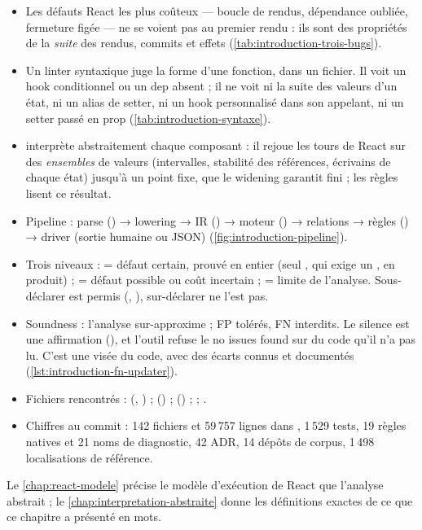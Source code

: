 \begin{resume}
  \begin{itemize}
    \item Les défauts React les plus coûteux --- boucle de rendus, dépendance
      oubliée, fermeture figée --- ne se voient pas au premier rendu : ils
      sont des propriétés de la \emph{suite} des rendus, commits et effets
      (\cref{tab:introduction-trois-bugs}).
    \item Un linter syntaxique juge la forme d'une fonction, dans un fichier.
      Il voit un hook conditionnel ou un dep absent ; il ne voit ni la suite
      des valeurs d'un état, ni un alias de setter, ni un hook personnalisé
      dans son appelant, ni un setter passé en prop
      (\cref{tab:introduction-syntaxe}).
    \item \reactant{} interprète abstraitement chaque composant : il rejoue
      les tours de React sur des \emph{ensembles} de valeurs (intervalles,
      stabilité des références, écrivains de chaque état) jusqu'à un point
      fixe, que le widening garantit fini ; les règles lisent ce résultat.
    \item Pipeline : parse () → lowering → IR ()
      → moteur () → relations → règles
      () → driver (sortie humaine ou JSON)
      (\cref{fig:introduction-pipeline}).
    \item Trois niveaux : \Error{} = défaut certain, prouvé en entier (seul
      , qui exige un , en produit) ;
      \Warning{} = défaut possible ou coût incertain ; \Info{} = limite de
      l'analyse. Sous-déclarer est permis (, ),
      sur-déclarer ne l'est pas.
    \item Soundness : l'analyse sur-approxime ; FP tolérés, FN interdits. Le
      silence est une affirmation (), et l'outil refuse le
      \og no issues found\fg{} sur du code qu'il n'a pas lu. C'est une visée
      du code, avec des écarts connus et documentés
      (\cref{lst:introduction-fn-updater}).
    \item \sloppy Fichiers rencontrés :
       (,
      ) ; 
      () ;  () ;
       ; .
    \item Chiffres au commit \snapshotCommit{} : 142 fichiers et
      59\,757 lignes dans , 1\,529 tests, 19 règles natives et
      21 noms de diagnostic, 42 ADR, 14 dépôts de corpus, 1\,498
      localisations de référence.
  \end{itemize}
  Le \cref{chap:react-modele} précise le modèle d'exécution de React que
  l'analyse abstrait ; le \cref{chap:interpretation-abstraite} donne les
  définitions exactes de ce que ce chapitre a présenté en mots.
\end{resume}

